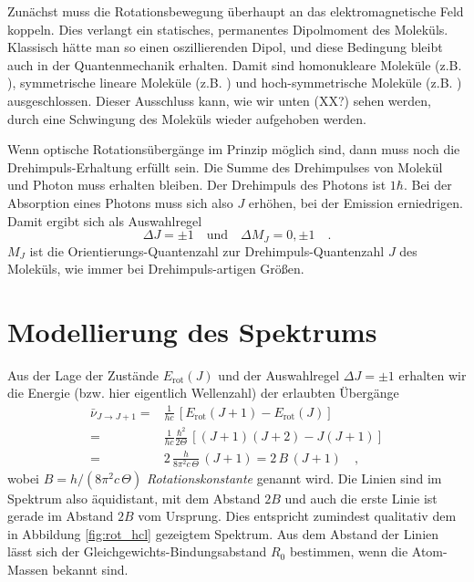 Zunächst muss die Rotationsbewegung überhaupt an das elektromagnetische Feld koppeln. Dies verlangt  ein statisches, permanentes Dipolmoment des Moleküls. Klassisch hätte man so einen oszillierenden Dipol, und diese Bedingung bleibt auch in der Quantenmechanik erhalten. Damit sind homonukleare Moleküle (z.B. ), symmetrische lineare Moleküle (z.B. ) und hoch-symmetrische Moleküle (z.B. ) ausgeschlossen. Dieser Ausschluss kann, wie wir unten (XX?) sehen werden, durch eine Schwingung des Moleküls wieder aufgehoben werden.

Wenn optische Rotationsübergänge im Prinzip möglich sind, dann muss noch die Drehimpuls-Erhaltung erfüllt sein. Die Summe des Drehimpulses von Molekül und Photon muss erhalten bleiben. Der Drehimpuls des Photons ist $1 \hbar$. Bei der Absorption eines Photons muss sich also $J$ erhöhen, bei der Emission erniedrigen. Damit ergibt sich als Auswahlregel
\begin{equation}
\Delta J = \pm 1 \quad \text{und} \quad \Delta M_J = 0, \pm 1 \quad .
\end{equation}
$M_J$ ist die Orientierungs-Quantenzahl zur Drehimpuls-Quantenzahl $J$ des Moleküls, wie immer bei Drehimpuls-artigen Größen.

\section{Modellierung des Spektrums}

\begin{marginfigure}
\caption{Skizze Zustände und Übergange.}
\end{marginfigure}


Aus der Lage der Zustände $E_\text{rot}(J)$ und der Auswahlregel $\Delta J = \pm 1$ erhalten wir die  Energie (bzw. hier eigentlich Wellenzahl) der erlaubten Übergänge
\begin{align}
 \bar{\nu}_{J \rightarrow J + 1} =& \frac{1}{h c}  \, \left[ E_\text{rot}(J+1) - E_\text{rot}(J) \right]
 \\ 
 =  & \frac{1}{h c}\frac{\hbar^2}{2 \Theta} \, \left[ (J+1)(J+2) - J (J+1) \right] \\
 = & 2 \, \frac{h}{8 \pi^2 c \, \Theta} \, \left( J +1 \right) = 2 \, B \, (J+1) \quad ,
\end{align}
wobei $B = h / (8 \pi^2 c \, \Theta)$ \emph{Rotationskonstante} genannt wird. Die Linien sind im Spektrum also äquidistant, mit dem Abstand $2B$ und auch die erste Linie ist gerade im Abstand $2B$ vom Ursprung. Dies entspricht zumindest qualitativ dem in Abbildung \ref{fig:rot_hcl} gezeigtem Spektrum. Aus dem Abstand der Linien lässt sich der Gleichgewichts-Bindungsabstand $R_0$ bestimmen, wenn die Atom-Massen bekannt sind.



